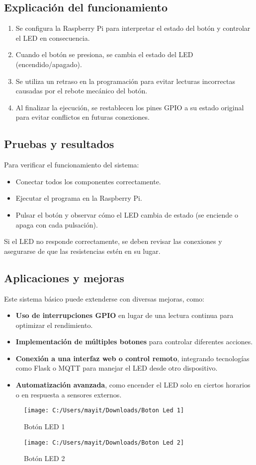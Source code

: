 \subsection{Explicación del funcionamiento}
\begin{enumerate}
	\item Se configura la Raspberry Pi para interpretar el estado del botón y controlar el LED en consecuencia.
	\item Cuando el botón se presiona, se cambia el estado del LED (encendido/apagado).
	\item Se utiliza un retraso en la programación para evitar lecturas incorrectas causadas por el rebote mecánico del botón.
	\item Al finalizar la ejecución, se restablecen los pines GPIO a su estado original para evitar conflictos en futuras conexiones.
\end{enumerate}

\subsection{Pruebas y resultados}
Para verificar el funcionamiento del sistema:
\begin{itemize}
	\item Conectar todos los componentes correctamente.
	\item Ejecutar el programa en la Raspberry Pi.
	\item Pulsar el botón y observar cómo el LED cambia de estado (se enciende o apaga con cada pulsación).
\end{itemize}

Si el LED no responde correctamente, se deben revisar las conexiones y asegurarse de que las resistencias estén en su lugar.

\subsection{Aplicaciones y mejoras}
Este sistema básico puede extenderse con diversas mejoras, como:
\begin{itemize}
	\item \textbf{Uso de interrupciones GPIO} en lugar de una lectura continua para optimizar el rendimiento.
	\item \textbf{Implementación de múltiples botones} para controlar diferentes acciones.
	\item \textbf{Conexión a una interfaz web o control remoto}, integrando tecnologías como Flask o MQTT para manejar el LED desde otro dispositivo.
	\item \textbf{Automatización avanzada}, como encender el LED solo en ciertos horarios o en respuesta a sensores externos.
\end{itemize}

\begin{figure}[h]
	\centering
	\texttt{[image: C:/Users/mayit/Downloads/Boton Led 1]}
	\caption{Botón LED 1}
\end{figure}

\begin{figure}[h]
	\centering
	\texttt{[image: C:/Users/mayit/Downloads/Boton Led 2]}
	\caption{Botón LED 2}
\end{figure}

\newpage